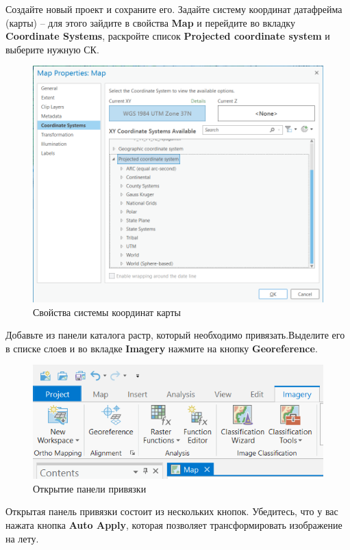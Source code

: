 \documentclass[
  12pt,
]{book}
\begin{document}
Создайте новый проект и сохраните его. Задайте систему координат датафрейма (карты) -- для этого зайдите в свойства \textbf{Map} и перейдите во вкладку \textbf{Coordinate Systems}, раскройте список \textbf{Projected coordinate system} и выберите нужную СК.

\begin{figure}
\centering
\includegraphics{images/Ref02/Arc_mapCRS.png}
\caption{Свойства системы координат карты}
\end{figure}

Добавьте из панели каталога растр, который необходимо привязать.Выделите его в списке слоев и во вкладке \textbf{Imagery} нажмите на кнопку \textbf{Georeference}.

\begin{figure}
\centering
\includegraphics{images/Ref02/Arc_georeference.png}
\caption{Открытие панели привязки}
\end{figure}

Открытая панель привязки состоит из нескольких кнопок. Убедитесь, что у вас нажата кнопка \textbf{Auto Apply}, которая позволяет трансформировать изображение на лету.
\end{document}
